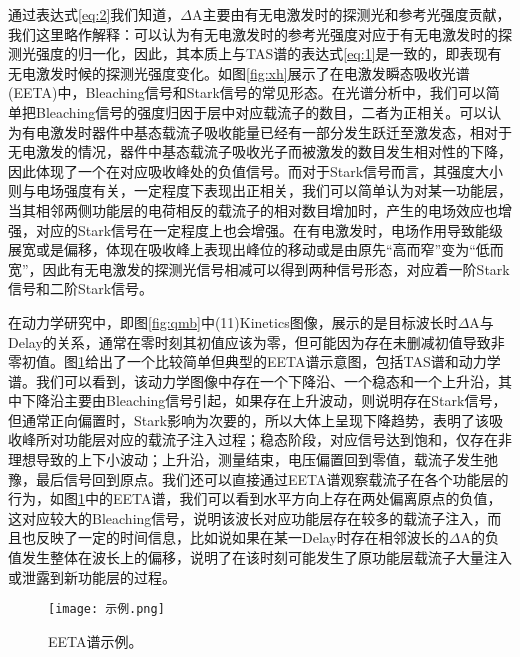 通过表达式\ref{eq:2}我们知道，$\Delta$A主要由有无电激发时的探测光和参考光强度贡献，我们这里略作解释：可以认为有无电激发时的参考光强度对应于有无电激发时的探测光强度的归一化，因此，其本质上与TAS谱的表达式\ref{eq:1}是一致的，即表现有无电激发时候的探测光强度变化。如图\ref{fig:xh}展示了在电激发瞬态吸收光谱(EETA)中，Bleaching信号和Stark信号的常见形态。在光谱分析中，我们可以简单把Bleaching信号的强度归因于层中对应载流子的数目，二者为正相关。可以认为有电激发时器件中基态载流子吸收能量已经有一部分发生跃迁至激发态，相对于无电激发的情况，器件中基态载流子吸收光子而被激发的数目发生相对性的下降，因此体现了一个在对应吸收峰处的负值信号。而对于Stark信号而言，其强度大小则与电场强度有关，一定程度下表现出正相关，我们可以简单认为对某一功能层，当其相邻两侧功能层的电荷相反的载流子的相对数目增加时，产生的电场效应也增强，对应的Stark信号在一定程度上也会增强。在有电激发时，电场作用导致能级展宽或是偏移，体现在吸收峰上表现出峰位的移动或是由原先“高而窄”变为“低而宽”，因此有无电激发的探测光信号相减可以得到两种信号形态，对应着一阶Stark信号和二阶Stark信号。

在动力学研究中，即图\ref{fig:qmb}中(11)Kinetics图像，展示的是目标波长时$\Delta$A与Delay的关系，通常在零时刻其初值应该为零，但可能因为存在未删减初值导致非零初值。图\ref{fig:sl}给出了一个比较简单但典型的EETA谱示意图，包括TAS谱和动力学谱。我们可以看到，该动力学图像中存在一个下降沿、一个稳态和一个上升沿，其中下降沿主要由Bleaching信号引起，如果存在上升波动，则说明存在Stark信号，但通常正向偏置时，Stark影响为次要的，所以大体上呈现下降趋势，表明了该吸收峰所对功能层对应的载流子注入过程；稳态阶段，对应信号达到饱和，仅存在非理想导致的上下小波动；上升沿，测量结束，电压偏置回到零值，载流子发生弛豫，最后信号回到原点。我们还可以直接通过EETA谱观察载流子在各个功能层的行为，如图\ref{fig:sl}中的EETA谱，我们可以看到水平方向上存在两处偏离原点的负值，这对应较大的Bleaching信号，说明该波长对应功能层存在较多的载流子注入，而且也反映了一定的时间信息，比如说如果在某一Delay时存在相邻波长的$\Delta$A的负值发生整体在波长上的偏移，说明了在该时刻可能发生了原功能层载流子大量注入或泄露到新功能层的过程。

\begin{figure}[ht]
	\centering
	\texttt{[image: 示例.png]}
	\caption{EETA谱示例。}
	\label{fig:sl}
\end{figure}
